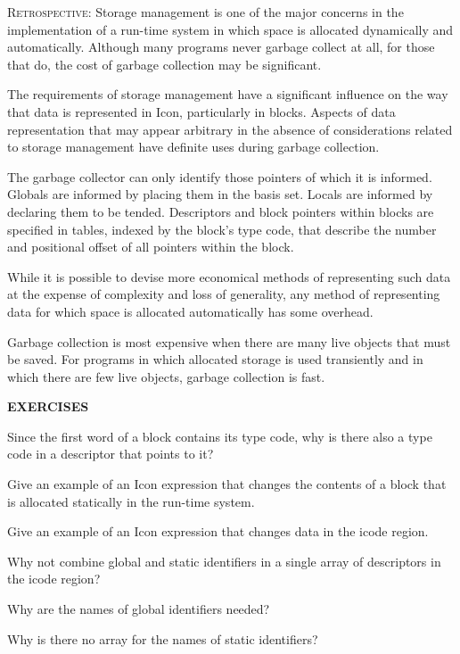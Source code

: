 \textsc{Retrospective}: Storage management is one of the major
concerns in the implementation of a run-time system in which space is
allocated dynamically and automatically. Although many programs never
garbage collect at all, for those that do, the cost of garbage
collection may be significant.

The requirements of storage management have a significant influence on
the way that data is represented in Icon, particularly in
blocks. Aspects of data representation that may appear arbitrary in
the absence of considerations related to storage management have
definite uses during garbage collection.

The garbage collector can only identify those pointers of which it is
informed. Globals are informed by placing them in the basis
set. Locals are informed by declaring them to be tended. Descriptors
and block pointers within blocks are specified in tables, indexed by
the block's type code, that describe the number and positional offset
of all pointers within the block.

While it is possible to devise more economical methods of representing
such data at the expense of complexity and loss of generality, any
method of representing data for which space is allocated automatically
has some overhead.

Garbage collection is most expensive when there are many live objects
that must be saved. For programs in which allocated storage is used
transiently and in which there are few live objects, garbage
collection is fast.

\bigskip

\noindent\textbf{EXERCISES}

 Since the first word of a block contains its type
code, why is there also a type code in a descriptor that points to it?

 Give an example of an Icon expression that
changes the contents of a block that is allocated statically in the
run-time system.

 Give an example of an Icon expression that
changes data in the icode region.

 Why not combine global and static identifiers in
a single array of descriptors in the icode region?

 Why are the names of global identifiers needed?

 Why is there no array for the names of static identifiers?

